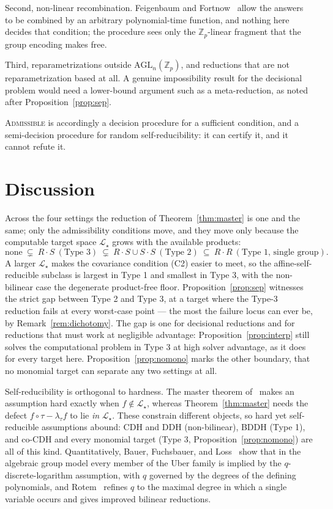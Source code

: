 \documentclass{conjura-solution}
\newcommand{\Zp}{\mathbb{Z}_p}
\newcommand{\LL}{\mathcal{L}}
\newcommand{\AGL}{\mathrm{AGL}}
\begin{document}
Second, non-linear recombination. Feigenbaum and Fortnow~\cite{FF93} allow the answers to be
combined by an arbitrary polynomial-time function, and nothing here decides that condition; the
procedure sees only the $\Zp$-linear fragment that the group encoding makes free.

Third, reparametrizations outside $\AGL_n(\Zp)$, and reductions that are not reparametrization
based at all. A genuine impossibility result for the decisional problem would need a lower-bound
argument such as a meta-reduction, as noted after Proposition~\ref{prop:sep}.

\textsc{Admissible} is accordingly a decision procedure for a sufficient condition, and a
semi-decision procedure for random self-reducibility: it can certify it, and it cannot refute
it.

\section{Discussion}
\label{sec:discussion}

Across the four settings the reduction of Theorem~\ref{thm:master} is one and the same;
only the admissibility conditions move, and they move only because the computable target
space $\LL_\star$ grows with the available products:
\[
  \text{none}\ \subsetneq\ R\cdot S\ (\text{Type 3})\ \subsetneq\ R\cdot S\cup S\cdot S\
  (\text{Type 2})\ \subseteq\ R\cdot R\ (\text{Type 1, single group}).
\]
A larger $\LL_\star$ makes the covariance condition (C2) easier to meet, so the
affine-self-reducible subclass is largest in Type 1 and smallest in Type 3, with the
non-bilinear case the degenerate product-free floor. Proposition~\ref{prop:sep} witnesses the
strict gap between Type 2 and Type 3, at a target where the Type-3 reduction fails at every
worst-case point --- the most the failure locus can ever be, by
Remark~\ref{rem:dichotomy}. The gap is one for decisional reductions and for reductions that
must work at negligible advantage: Proposition~\ref{prop:interp} still solves the
computational problem in Type 3 at high solver advantage, as it does for every target here.
Proposition~\ref{prop:nomono} marks the other boundary, that no monomial target can separate
any two settings at all.

Self-reducibility is orthogonal to hardness. The master theorem
of~\cite{BBG05,Boyen08} makes an assumption hard exactly when $f\notin\LL_\star$, whereas
Theorem~\ref{thm:master} needs the defect $f\circ\tau-\lambda_\tau f$ to lie \emph{in}
$\LL_\star$. These constrain different objects, so hard yet self-reducible assumptions
abound: CDH and DDH (non-bilinear), BDDH (Type 1), and co-CDH and every monomial target
(Type 3, Proposition~\ref{prop:nomono}) are all of this kind. Quantitatively, Bauer, Fuchsbauer, and
Loss~\cite{BFL20} show that in the algebraic group model every member of the Uber family is
implied by the $q$-discrete-logarithm assumption, with $q$ governed by the degrees of the
defining polynomials, and Rotem~\cite{Rotem22} refines $q$ to the maximal degree in which a
single variable occurs and gives improved bilinear reductions.
\end{document}
